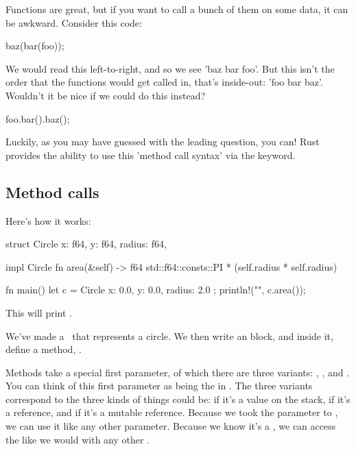 Functions are great, but if you want to call a bunch of them on some data, it can be awkward. Consider this code:

\begin{rustc}
baz(bar(foo));
\end{rustc}

We would read this left-to-right, and so we see 'baz bar foo'. But this isn't the order that the functions would get called in, that's 
inside-out: 'foo bar baz'. Wouldn't it be nice if we could do this instead?

\begin{rustc}
foo.bar().baz();
\end{rustc}

Luckily, as you may have guessed with the leading question, you can! Rust provides the ability to use this 'method call syntax' via the 
 keyword.

\subsection*{Method calls}

Here's how it works:

\begin{rustc}
struct Circle {
    x: f64,
    y: f64,
    radius: f64,
}

impl Circle {
    fn area(&self) -> f64 {
        std::f64::consts::PI * (self.radius * self.radius)
    }
}

fn main() {
    let c = Circle { x: 0.0, y: 0.0, radius: 2.0 };
    println!("{}", c.area());
}
\end{rustc}

This will print .

We've made a \struct\ that represents a circle. We then write an  block, and inside it, define a method, .

\blank

Methods take a special first parameter, of which there are three variants: , , and . You can think 
of this first parameter as being the  in . The three variants correspond to the three kinds of things  
could be:  if it's a value on the stack,  if it's a reference, and  if it's a mutable reference. 
Because we took the  parameter to , we can use it like any other parameter. Because we know it's a , 
we can access the  like we would with any other \struct.

